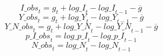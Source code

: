 \begin{dmath}
{I\_obs}_{t}={{g}}_{t}+{log\_I}_{t}-{log\_I}_{t-1}-{{\overline{g}}}
\end{dmath}
\begin{dmath}
{Y\_obs}_{t}={{g}}_{t}+{log\_Y}_{t}-{log\_Y}_{t-1}-{{\overline{g}}}
\end{dmath}
\begin{dmath}
{Y\_N\_obs}_{t}={{g}}_{t}+{log\_Y\_N}_{t}-{log\_Y\_N}_{t-1}-{{\overline{g}}}
\end{dmath}
\begin{dmath}
{p\_I\_obs}_{t}={log\_p\_I}_{t}-{log\_p\_I}_{t-1}
\end{dmath}
\begin{dmath}
{N\_obs}_{t}={log\_N}_{t}-{log\_N}_{t-1}
\end{dmath}
